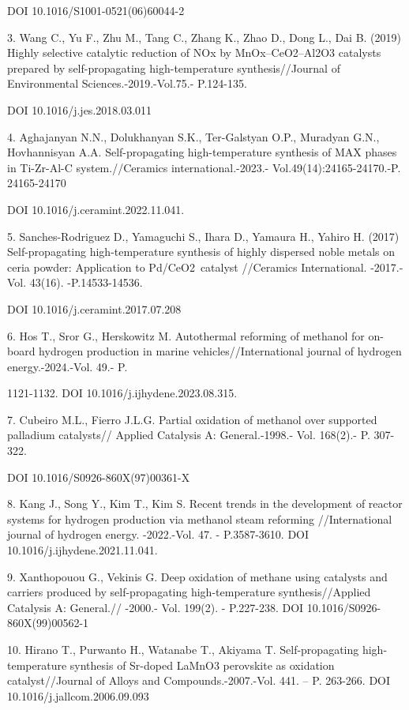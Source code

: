 DOI 10.1016/S1001-0521(06)60044-2

3. Wang C., Yu F., Zhu M., Tang C., Zhang K., Zhao D., Dong L., Dai B.
(2019) Highly selective catalytic reduction of NOx by MnOx--CeO2--Al2O3
catalysts prepared by self-propagating high-temperature
synthesis//Journal of Environmental Sciences.-2019.-Vol.75.- P.124-135.

DOI 10.1016/j.jes.2018.03.011

4. Aghajanyan N.N., Dolukhanyan S.K., Ter-Galstyan O.P., Muradyan G.N.,
Hovhannisyan A.A. Self-propagating high-temperature synthesis of MAX
phases in Ti-Zr-Al-C system.//Ceramics international.-2023.-
Vol.49(14):24165-24170.-P. 24165-24170

DOI 10.1016/j.ceramint.2022.11.041.

5. Sanches-Rodriguez D., Yamaguchi S., Ihara D., Yamaura H., Yahiro H.
(2017) Self-propagating high-temperature synthesis of highly dispersed
noble metals on ceria powder: Application to Pd/CeO2~catalyst //Ceramics
International. -2017.- Vol. 43(16). -P.14533-14536.

DOI 10.1016/j.ceramint.2017.07.208

6. Hos T., Sror G., Herskowitz M. Autothermal reforming of methanol for
on-board hydrogen production in marine vehicles//International journal
of hydrogen energy.-2024.-Vol. 49.- P.

1121-1132. DOI 10.1016/j.ijhydene.2023.08.315.

7. Cubeiro M.L., Fierro J.L.G. Partial oxidation of methanol over
supported palladium catalysts// Applied Catalysis A: General.-1998.-
Vol. 168(2).- P. 307-322.

DOI 10.1016/S0926-860X(97)00361-X

8. Kang J., Song Y., Kim T., Kim S. Recent trends in the development of
reactor systems for hydrogen production via methanol steam reforming
//International journal of hydrogen energy. -2022.-Vol. 47. -
P.3587-3610. DOI 10.1016/j.ijhydene.2021.11.041.

9. Xanthopouou G., Vekinis G. Deep oxidation of methane using catalysts
and carriers produced by self-propagating high-temperature
synthesis//Applied Catalysis A: General.// -2000.- Vol. 199(2). -
P.227-238. DOI 10.1016/S0926-860X(99)00562-1

10. Hirano T., Purwanto H., Watanabe T., Akiyama T. Self-propagating
high-temperature synthesis of Sr-doped LaMnO3 perovskite as oxidation
catalyst//Journal of Alloys and Compounds.-2007.-Vol. 441. -- P.
263-266. DOI 10.1016/j.jallcom.2006.09.093

